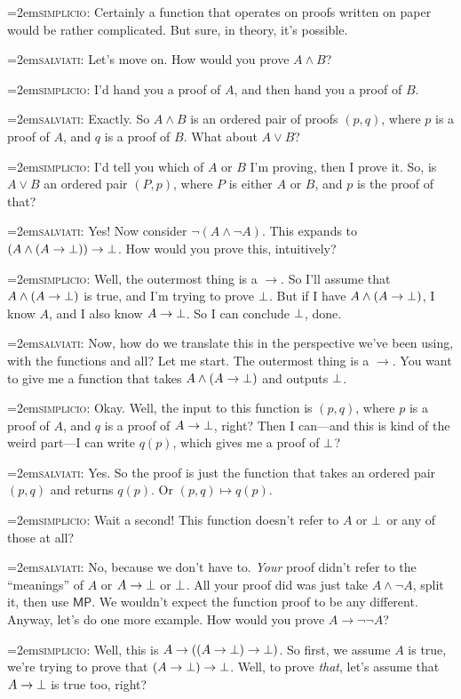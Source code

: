\documentclass[11pt,paper=letter]{scrartcl}
\newcommand{\sf}{\mathsf}
\renewcommand{\land}{\wedge}
\renewcommand{\lor}{\vee}
\renewcommand{\lnot}{\neg}
\newcommand{\simp}{\vspace{0.5em}\noindent\hangindent=2em\textsc{simplicio:} }
\newcommand{\salv}{\vspace{0.5em}\noindent\hangindent=2em\textsc{salviati:} }
\begin{document}
\simp Certainly a function that operates on proofs written on paper would be rather complicated. But sure, in theory, it's possible.

\salv Let's move on. How would you prove $A \land B$?

\simp I'd hand you a proof of $A$, and then hand you a proof of $B$.

\salv Exactly. So $A \land B$ is an ordered pair of proofs $(p, q)$, where $p$ is a proof of $A$, and $q$ is a proof of $B$. What about $A \lor B$?

\simp I'd tell you which of $A$ or $B$ I'm proving, then I prove it. So, is $A \lor B$ an ordered pair $(P, p)$, where $P$ is either $A$ or $B$, and $p$ is the proof of that?

\salv Yes! Now consider $\lnot (A \land \lnot A)$. This expands to $(A \land (A \to \false)) \to \false$. How would you prove this, intuitively?

\simp Well, the outermost thing is a $\to$. So I'll assume that $A \land (A \to \false)$ is true, and I'm trying to prove $\bot$. But if I have $A \land (A \to \false)$, I know $A$, and I also know $A \to \bot$. So I can conclude $\bot$, done.

\salv Now, how do we translate this in the perspective we've been using, with the functions and all? Let me start. The outermost thing is a $\to$. You want to give me a function that takes $A \land (A \to \false)$ and outputs $\bot$.

\simp Okay. Well, the input to this function is $(p, q)$, where $p$ is a proof of $A$, and $q$ is a proof of $A \to \bot$, right? Then I can---and this is kind of the weird part---I can write $q(p)$, which gives me a proof of $\bot$?

\salv Yes. So the proof is just the function that takes an ordered pair $(p, q)$ and returns $q(p)$. Or $(p, q) \mapsto q(p)$.

\simp Wait a second! This function doesn't refer to $A$ or $\bot$ or any of those at all?

\salv No, because we don't have to. \emph{Your} proof didn't refer to the ``meanings'' of $A$ or $A \to \bot$ or $\bot$. All your proof did was just take $A \land \lnot A$, split it, then use $\sf{MP}$. We wouldn't expect the function proof to be any different. Anyway, let's do one more example. How would you prove $A \to \lnot\lnot A$?

\simp Well, this is $A \to ((A \to \bot) \to \bot)$. So first, we assume $A$ is true, we're trying to prove that $(A \to \bot) \to \bot$. Well, to prove \emph{that}, let's assume that $A \to \bot$ is true too, right?
\end{document}
